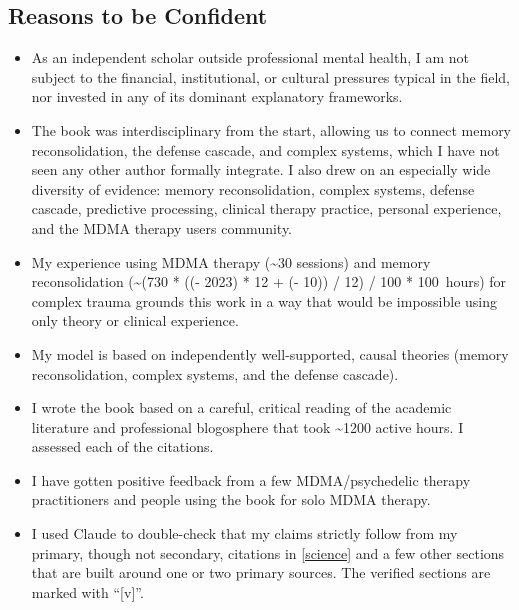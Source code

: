 \documentclass[11pt,oneside]{book}
\newcommand{\reconsolidationhours}{\the\numexpr (730 * ((\year - 2023) * 12 + (\month - 10)) / 12) / 100 * 100 \relax{}}
\begin{document}
\subsection*{Reasons to be Confident}
\begin{itemize}
    \item As an independent scholar outside professional mental health, I am not subject to the financial, institutional, or cultural pressures typical in the field, nor invested in any of its dominant explanatory frameworks.
    \item The book was interdisciplinary from the start, allowing us to connect memory reconsolidation, the defense cascade, and complex systems, which I have not seen any other author formally integrate. I also drew on an especially wide diversity of evidence: memory reconsolidation, complex systems, defense cascade, predictive processing, clinical therapy practice, personal experience, and the MDMA therapy users community.
    \item My experience using MDMA therapy (\textasciitilde30 sessions) and memory reconsolidation (\textasciitilde\reconsolidationhours{}\,hours) for complex trauma grounds this work in a way that would be impossible using only theory or clinical experience.
    \item My model is based on independently well-supported, causal theories (memory reconsolidation, complex systems, and the defense cascade).
    \item I wrote the book based on a careful, critical reading of the academic literature and professional blogosphere that took \textasciitilde1200 active hours. I assessed each of the  citations.
    \item I have gotten positive feedback from a few MDMA/psychedelic therapy practitioners and people using the book for solo MDMA therapy.
    \item I used Claude to double-check that my claims strictly follow from my primary, though not secondary, citations in \cref{science} and a few other sections that are built around one or two primary sources. The verified sections are marked with \enquote{[v]}.
\end{itemize}
\end{document}
